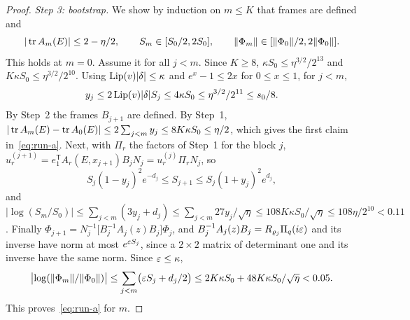 \begin{proof}
\emph{Step 3: bootstrap.} We show by induction on $m\le K$ that frames are defined and
\begin{equation}\label{eq:run-a}
|\operatorname{tr} A_m(E)|\le2-\eta/2,\qquad S_m\in[S_0/2,2S_0],\qquad\|\Phi_m\|\in[\|\Phi_0\|/2,2\|\Phi_0\|].
\end{equation}
This holds at $m=0$. Assume it for all $j<m$. Since $K\ge8$, $\kappa S_0\le\eta^{3/2}/2^{13}$ and $K\kappa S_0\le\eta^{3/2}/2^{10}$. Using $\operatorname{Lip}(v)|\delta|\le\kappa$ and $e^x-1\le2x$ for $0\le x\le1$, for $j<m$,
\[
y_j\le2\operatorname{Lip}(v)|\delta|S_j\le4\kappa S_0\le\eta^{3/2}/2^{11}\le s_0/8 .
\]
By Step~2 the frames $B_{j+1}$ are defined. By Step~1, $|\operatorname{tr} A_m(E)-\operatorname{tr} A_0(E)|\le2\sum_{j<m}y_j\le8K\kappa S_0\le\eta/2$, which gives the first claim in~\eqref{eq:run-a}. Next, with $\Pi_r$ the factors of Step~1 for the block $j$, $u^{(j+1)}_r=e_1^{\mathsf T}A_r(E,x_{j+1})B_jN_j=u^{(j)}_r\Pi_rN_j$, so
\[
S_j(1-y_j)^2e^{-d_j}\le S_{j+1}\le S_j(1+y_j)^2e^{d_j},
\]
and $|\log(S_m/S_0)|\le\sum_{j<m}(3y_j+d_j)\le\sum_{j<m}27y_j/\sqrt\eta\le108K\kappa S_0/\sqrt\eta\le108\eta/2^{10}<0.11$. Finally $\Phi_{j+1}=N_j^{-1}\bigl[B_j^{-1}A_j(z)B_j\bigr]\Phi_j$, and $B_j^{-1}A_j(z)B_j=R_{\varrho_j}\Pi_q(i\varepsilon)$ and its inverse have norm at most $e^{\varepsilon S_j}$, since a $2\times2$ matrix of determinant one and its inverse have the same norm. Since $\varepsilon\le\kappa$,
\[
\bigl|\log(\|\Phi_m\|/\|\Phi_0\|)\bigr|\le\sum_{j<m}\bigl(\varepsilon S_j+d_j/2\bigr)\le2K\kappa S_0+48K\kappa S_0/\sqrt\eta<0.05 .
\]
This proves~\eqref{eq:run-a} for $m$.


\end{proof}
